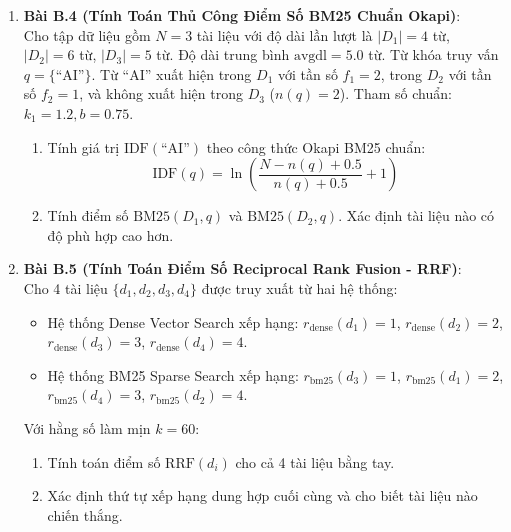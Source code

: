 \begin{enumerate}
  \item \textbf{Bài B.4 (Tính Toán Thủ Công Điểm Số BM25 Chuẩn Okapi)}: \\
  Cho tập dữ liệu gồm $N = 3$ tài liệu với độ dài lần lượt là $|D_1| = 4$ từ, $|D_2| = 6$ từ, $|D_3| = 5$ từ. Độ dài trung bình $\text{avgdl} = 5.0$ từ.
  Từ khóa truy vấn $q = \{\text{``AI''}\}$.
  Từ ``AI'' xuất hiện trong $D_1$ với tần số $f_1 = 2$, trong $D_2$ với tần số $f_2 = 1$, và không xuất hiện trong $D_3$ ($n(q) = 2$).
  Tham số chuẩn: $k_1 = 1.2, b = 0.75$.
  \begin{enumerate}
    \item Tính giá trị $\text{IDF}(\text{``AI''})$ theo công thức Okapi BM25 chuẩn:
    \begin{equation*}
    \text{IDF}(q) = \ln \left( \frac{N - n(q) + 0.5}{n(q) + 0.5} + 1 \right)
    \end{equation*}
    \item Tính điểm số $\text{BM25}(D_1, q)$ và $\text{BM25}(D_2, q)$. Xác định tài liệu nào có độ phù hợp cao hơn.
  \end{enumerate}

  \item \textbf{Bài B.5 (Tính Toán Điểm Số Reciprocal Rank Fusion - RRF)}: \\
  Cho 4 tài liệu $\{d_1, d_2, d_3, d_4\}$ được truy xuất từ hai hệ thống:
  \begin{itemize}
    \item Hệ thống Dense Vector Search xếp hạng: $r_{\text{dense}}(d_1) = 1$, $r_{\text{dense}}(d_2) = 2$, $r_{\text{dense}}(d_3) = 3$, $r_{\text{dense}}(d_4) = 4$.
    \item Hệ thống BM25 Sparse Search xếp hạng: $r_{\text{bm25}}(d_3) = 1$, $r_{\text{bm25}}(d_1) = 2$, $r_{\text{bm25}}(d_4) = 3$, $r_{\text{bm25}}(d_2) = 4$.
  \end{itemize}
  Với hằng số làm mịn $k = 60$:
  \begin{enumerate}
    \item Tính toán điểm số $\text{RRF}(d_i)$ cho cả 4 tài liệu bằng tay.
    \item Xác định thứ tự xếp hạng dung hợp cuối cùng và cho biết tài liệu nào chiến thắng.
  \end{enumerate}
\end{enumerate}

